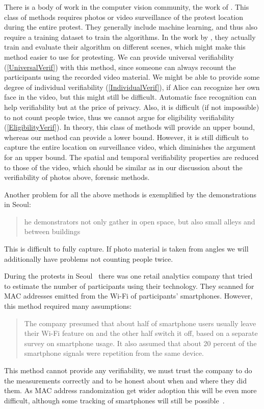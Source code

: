 There is a body of work in the computer vision community, \eg the work of 
\citet{NNCrowdCounting}.
This class of methods requires photos or video surveillance of the protest 
location during the entire protest.
They generally include machine learning, and thus also require a training 
dataset to train the algorithms.
In the work by \citet{NNCrowdCounting}, they actually train and evaluate their 
algorithm on different scenes, which might make this method easier to use for 
protesting.
We can provide universal verifiability (\cref{UniversalVerif}) with this 
method, since someone can always recount the participants using the recorded 
video material.
We might be able to provide some degree of individual verifiability 
(\cref{IndividualVerif}), if Alice can recognize her own face in the video, but 
this might still be difficult. Automatic face recognition can help
verifiability but at the price of privacy.
Also, it is difficult (if not impossible) to not count people twice, thus we 
cannot argue for eligibility verifiability (\cref{EligibilityVerif}).
In theory, this class of methods will provide an upper bound, whereas our method 
can provide a lower bound.
However, it is still difficult to capture the entire location on surveillance 
video, which diminishes the argument for an upper bound.
The spatial and temporal verifiability properties are reduced to those of the 
video, which should be similar as in our discussion about the verifiability of 
photos above, \ie forensic methods.

Another problem for all the above methods is exemplified by the demonstrations 
in Seoul:
\blockcquote{2016DemonstrationsInSeoul}{%
  he demonstrators not only gather in open space, but also small 
  alleys and between buildings%
}.
This is difficult to fully capture.
If photo material is taken from angles we will additionally have problems not 
counting people twice.

During the protests in Seoul~\cite{2016DemonstrationsInSeoul} there was one 
retail analytics company that tried to estimate the number of participants using 
their technology.
They scanned for MAC addresses emitted from the Wi-Fi of participants' 
smartphones.
However, this method required many assumptions:
\blockcquote{2016DemonstrationsInSeoul}{%
  The company presumed that about half of smartphone users usually leave their 
  Wi-Fi feature on and the other half switch it off, based on a separate survey 
  on smartphone usage. It also assumed that about 20 percent of the smartphone 
  signals were repetition from the same device.
}
This method cannot provide any verifiability, we must trust the company to do 
the measurements correctly and to be honest about when and where they did them.
As MAC address randomization get wider adoption this will be even more 
difficult, although some tracking of smartphones will still be 
possible~\cite{WhyMACRandomizationIsNotEnough}.

